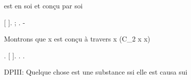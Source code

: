 \documentclass[10pt]{report}
\begin{document}
\begin{coqdoccode}
\begin{coqdoccomment}
est\coqdocindent{0.50em}
en\coqdocindent{0.50em}
soi\coqdocindent{0.50em}
et\coqdocindent{0.50em}
conçu\coqdocindent{0.50em}
par\coqdocindent{0.50em}
soi\coqdocindent{0.50em}
\end{coqdoccomment}
\coqdoceol
\coqdocindent{2.00em}
     [ ].\coqdoceol
\coqdocindent{2.00em}
 ; .\coqdoceol
\coqdocindent{1.00em}
- \begin{coqdoccomment}
\coqdocindent{0.50em}
Montrons\coqdocindent{0.50em}
que\coqdocindent{0.50em}
x\coqdocindent{0.50em}
est\coqdocindent{0.50em}
conçu\coqdocindent{0.50em}
à\coqdocindent{0.50em}
travers\coqdocindent{0.50em}
x\coqdocindent{0.50em}
(C\_2\coqdocindent{0.50em}
x\coqdocindent{0.50em}
x)\coqdocindent{0.50em}
\end{coqdoccomment}
\coqdoceol
\coqdocindent{2.00em}
   .\coqdoceol
\coqdocindent{2.00em}
   [\coqdocvar{\_} ].\coqdoceol
\coqdocindent{2.00em}
 .\coqdoceol
\coqdocnoindent
{}.\coqdoceol
\coqdocemptyline
\end{coqdoccode}
DPIII: Quelque chose est une substance ssi elle est causa sui 
\end{document}
